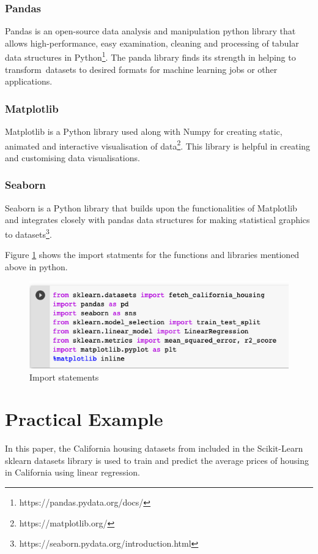 \documentclass[conference]{IEEEtran}
\begin{document}
\subsubsection{Pandas}
Pandas is an open-source data analysis and manipulation python library that allows high-performance, easy examination, cleaning and processing of tabular data structures in Python\footnote{https://pandas.pydata.org/docs/}. The panda library finds its strength in helping to transform datasets to desired formats for machine learning jobs or other applications.
\subsubsection{Matplotlib}
Matplotlib is a Python library used along with Numpy for creating static, animated and interactive visualisation of data\footnote{https://matplotlib.org/}. This library is helpful in creating and customising data visualisations.
\subsubsection{Seaborn}
Seaborn is a Python library that builds upon the functionalities of Matplotlib and integrates closely with pandas data structures for making statistical graphics to datasets\footnote{https://seaborn.pydata.org/introduction.html}.

 Figure \ref{fig:placeholder} shows the import statments for the functions and libraries mentioned above in python.
 \begin{figure}[htbp]
	\centerline{\includegraphics [scale=0.45]{figures/import_statements.png}}
	\caption{Import statements}
	\label{fig:placeholder}
\end{figure}
\section{Practical Example}
In this paper, the California housing datasets from \cite{KELLEYPACE1997291} included in the Scikit-Learn sklearn datasets library is used to train and predict the average prices of housing in California using linear regression. 
\end{document}
